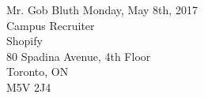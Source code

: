 \documentclass[]{deedy-resume-openfont}
\begin{document}
%
%



%
%

\begin{minipage}{0.80\textwidth}
\leavevmode \newline
\leavevmode \newline

Mr. Gob Bluth
\hspace{53ex} Monday, May 8th, 2017\\                    
Campus Recruiter \\
Shopify \\
80 Spadina Avenue, 4th Floor \\
Toronto, ON \\
M5V 2J4 \\
\sectionsep

\end{minipage}

\leavevmode \newline
\end{document}
